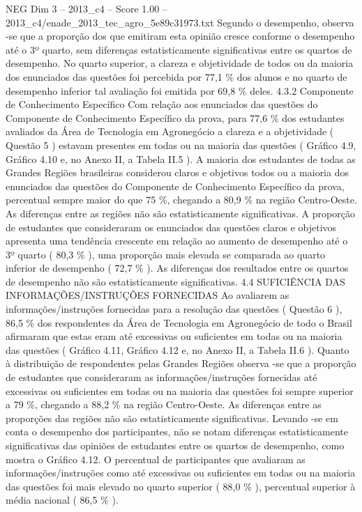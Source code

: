\begin{textsample}{NEG Dim 3 – 2013\_c4 – Score 1.00 – 2013\_c4/enade\_2013\_tec\_agro\_5e89c31973.txt}
Segundo o desempenho, observa -se que a proporção dos que emitiram esta opinião cresce conforme o desempenho até o 3º quarto, sem diferenças estatisticamente significativas entre os quartos de desempenho.
No quarto superior, a clareza e objetividade de todos ou da maioria dos enunciados das questões foi percebida por 77,1 \% dos alunos e no quarto de desempenho inferior tal avaliação foi emitida por 69,8 \% deles. 4.3.2 Componente de Conhecimento Específico Com relação aos enunciados das questões do Componente de Conhecimento Específico da prova, para 77,6 \% dos estudantes avaliados da Área de Tecnologia em Agronegócio a clareza e a objetividade ( Questão 5 ) estavam presentes em todas ou na maioria das questões ( Gráfico 4.9, Gráfico 4.10 e, no Anexo II, a Tabela II.5 ).
A maioria dos estudantes de todas as Grandes Regiões brasileiras considerou claros e objetivos todos ou a maioria dos enunciados das questões do Componente de Conhecimento Específico da prova, percentual sempre maior do que 75 \%, chegando a 80,9 \% na região Centro-Oeste.
As diferenças entre as regiões não são estatisticamente significativas.
A proporção de estudantes que consideraram os enunciados das questões claros e objetivos apresenta uma tendência crescente em relação ao aumento de desempenho até o 3º quarto ( 80,3 \% ), uma proporção mais elevada se comparada ao quarto inferior de desempenho ( 72,7 \% ).
As diferenças dos resultados entre os quartos de desempenho não são estatisticamente significativas. 4.4 SUFICIÊNCIA DAS INFORMAÇÕES/INSTRUÇÕES FORNECIDAS Ao avaliarem as informações/instruções fornecidas para a resolução das questões ( Questão 6 ), 86,5 \% dos respondentes da Área de Tecnologia em Agronegócio de todo o Brasil afirmaram que estas eram até excessivas ou suficientes em todas ou na maioria das questões ( Gráfico 4.11, Gráfico 4.12 e, no Anexo II, a Tabela II.6 ).
Quanto à distribuição de respondentes pelas Grandes Regiões observa -se que a proporção de estudantes que consideraram as informações/instruções fornecidas até excessivas ou suficientes em todas ou na maioria das questões foi sempre superior a 79 \%, chegando a 88,2 \% na região Centro-Oeste.
As diferenças entre as proporções das regiões não são estatisticamente significativas.
Levando -se em conta o desempenho dos participantes, não se notam diferenças estatisticamente significativas das opiniões de estudantes entre os quartos de desempenho, como mostra o Gráfico 4.12.
O percentual de participantes que avaliaram as informações/instruções como até excessivas ou suficientes em todas ou na maioria das questões foi mais elevado no quarto superior ( 88,0 \% ), percentual superior à média nacional ( 86,5 \% ).

\end{textsample}
